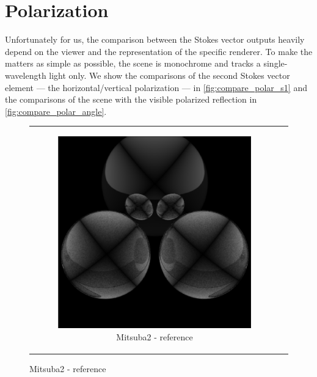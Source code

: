 \section{Polarization}

Unfortunately for us, the comparison between the Stokes vector outputs heavily depend on the viewer and the representation of the specific renderer. To make the matters as simple as possible, the scene is monochrome and tracks a single-wavelength light only. We show the comparisons of the second Stokes vector element --- the horizontal/vertical polarization --- in \autoref{fig:compare_polar_s1} and the comparisons of the scene with the visible polarized reflection in \autoref{fig:compare_polar_angle}.

\renewcommand\thesubfigure{\arabic{subfigure}}
\begin{figure}[h]
	\centering
	\begin{tabular}{cc}
		\begin{subfigure}
			{0.4\textwidth}\centering\includegraphics[width=\linewidth]{img/polarizing_spheres.s1.png}
			\caption{Mitsuba2 - reference}
		\end{subfigure}
		&
		\begin{subfigure}

\end{subfigure}
\end{tabular}
\end{figure}
